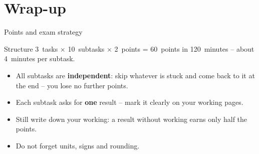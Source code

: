 \documentclass[aspectratio=169,11pt]{beamer}
\begin{document}
\section*{Wrap-up}
\begin{frame}{Points and exam strategy}
  \begin{block}{Structure}
    3~tasks $\times$ 10~subtasks $\times$ 2~points = 60~points in 120~minutes
    -- about 4~minutes per subtask.
  \end{block}
  \begin{itemize}\setlength{\itemsep}{4pt}
    \item All subtasks are \textbf{independent}: skip whatever is stuck and come back to it at
      the end -- you lose no further points.
    \item Each subtask asks for \textbf{one} result -- mark it clearly on your working pages.
    \item Still write down your working: a result without working earns only half the points.
    \item Do not forget units, signs and rounding.
  \end{itemize}
\end{frame}
\end{document}
